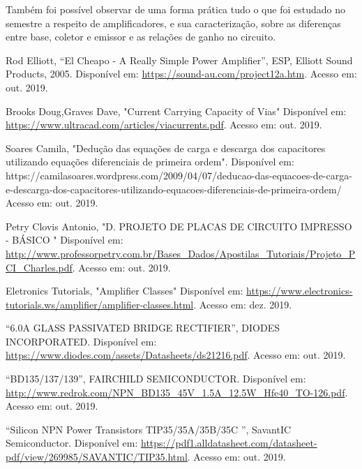 \documentclass[a4paper,12pt,oneside,openany,table,xcdraw]{article}
\begin{document}
Também foi possível observar de uma forma prática tudo o que foi estudado no semestre a respeito de amplificadores, e sua caracterização, sobre as diferenças entre base, coletor e emissor e as relações de ganho no circuito.


\newpage
\begin{thebibliography}{9} 
    Rod Elliott,
    “El Cheapo - A Really Simple Power Amplifier”, ESP, Elliott Sound Products, 2005.
 Disponível em:
 \url{https://sound-au.com/project12a.htm}. Acesso em: out. 2019.
 
 
    Brooks Doug,Graves Dave,
    "Current Carrying Capacity of Vias"
 Disponível em: 
 \url{https://www.ultracad.com/articles/viacurrents.pdf}. Acesso em: out. 2019.
 
    Soares Camila,
 "Dedução das equações de carga e descarga dos capacitores utilizando equações diferenciais de primeira ordem". 
  Disponível em: 
https://camilasoares.wordpress.com/2009/04/07/deducao-das-equacoes-de-carga-e-descarga-dos-capacitores-utilizando-equacoes-diferenciais-de-primeira-ordem/ 
Acesso em: out. 2019.
 
    Petry Clovis Antonio,
 "D. PROJETO DE PLACAS DE CIRCUITO
IMPRESSO - BÁSICO "
  Disponível em: 
 \url{http://www.professorpetry.com.br/Bases_Dados/Apostilas_Tutoriais/Projeto_PCI_Charles.pdf}. Acesso em: out. 2019.
 
    Eletronics Tutorials,
 "Amplifier Classes"
  Disponível em: 
 \url{https://www.electronics-tutorials.ws/amplifier/amplifier-classes.html}. Acesso em: dez. 2019.
 
 
        “6.0A GLASS PASSIVATED BRIDGE RECTIFIER”, DIODES INCORPORATED.
 Disponível em:
 \url{https://www.diodes.com/assets/Datasheets/ds21216.pdf}. Acesso em: out. 2019.
 
    “BD135/137/139”, FAIRCHILD SEMICONDUCTOR.
 Disponível em:
 \url{http://www.redrok.com/NPN_BD135_45V_1.5A_12.5W_Hfe40_TO-126.pdf}. Acesso em: out. 2019.
 
    “Silicon NPN Power Transistors TIP35/35A/35B/35C ”, SavantIC Semiconductor. 
 Disponível em:
 \url{https://pdf1.alldatasheet.com/datasheet-pdf/view/269985/SAVANTIC/TIP35.html}. Acesso em: out. 2019.

\end{thebibliography}
\end{document}

